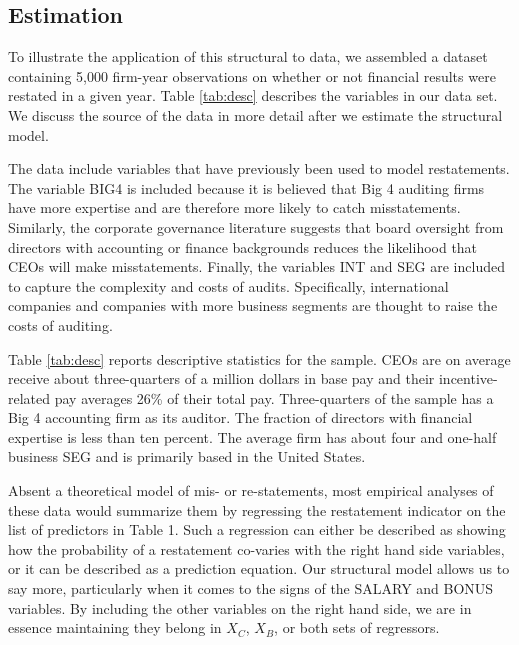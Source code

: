 \subsection{Estimation}

To illustrate the application of this structural to data, we assembled a dataset containing 5,000 firm-year observations on whether or not financial results were restated in a given year.
Table \ref{tab:desc} describes the variables in our data set.
We discuss the source of the data in more detail after we estimate the structural model.

The data include variables that have previously been used to model restatements.%
The variable BIG4 is included  because it is believed that Big 4 auditing firms have more expertise and are therefore more likely to catch misstatements. 
Similarly, the corporate governance literature suggests that board oversight from directors with accounting or finance backgrounds reduces the likelihood that CEOs will make misstatements. 
Finally, the variables INT and 
SEG are included to capture the complexity and costs of audits. 
Specifically, international companies and companies with more business segments are thought to raise the costs of auditing. 

Table \ref{tab:desc} reports descriptive statistics for the sample. CEOs are on average receive about three-quarters of a million dollars in base pay and their incentive-related pay averages 26\% of their total pay.
Three-quarters of the sample has a Big 4 accounting firm as its auditor. The fraction of directors with financial expertise is less than ten percent. 
The average firm has about four and one-half business SEG and is primarily based in the United States.

Absent a theoretical model of mis- or re-statements, most empirical
analyses of these data would summarize them by regressing the restatement
indicator on the list of predictors in Table 1. Such a regression can either be described
as showing how the probability of a restatement co-varies with the right hand side variables,
or it can be described as a prediction equation. Our structural model allows us to say more,
particularly when it comes to the signs of the SALARY and BONUS variables. By including
the other variables on the right hand side, we are in essence maintaining they belong in
$X_C$, $X_B$, or both sets of regressors.

